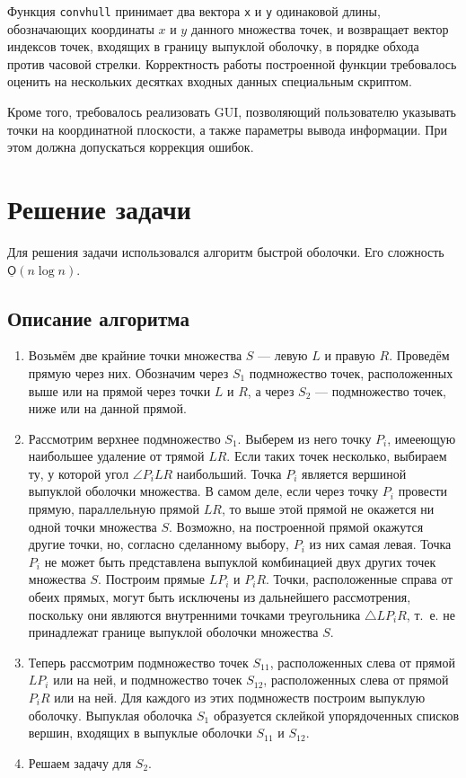 \documentclass[11pt]{article}
\begin{document}
Функция \texttt{convhull} принимает два вектора \texttt{x} и \texttt{y} одинаковой длины, обозначающих координаты $x$ и $y$ данного множества точек, и возвращает вектор индексов точек, входящих в границу выпуклой оболочку, в порядке обхода против часовой стрелки.
Корректность работы построенной функции требовалось оценить на нескольких десятках входных данных специальным скриптом.

Кроме того, требовалось реализовать GUI, позволяющий пользователю указывать точки на координатной плоскости, а также параметры вывода информации. При этом должна допускаться коррекция ошибок.

\section{Решение задачи}
Для решения задачи использовался алгоритм быстрой оболочки. Его сложность $\underline{\mathsf{O}}(n\log{n})$.
\subsection{Описание алгоритма}
\begin{enumerate}
	\item
		Возьмём две крайние точки множества $S$ --- левую $L$ и правую $R$. Проведём прямую через них. Обозначим через $S_1$ подмножество точек, расположенных выше или на прямой через точки $L$ и $R$, а через $S_2$ --- подмножество точек, ниже или на данной прямой.
	\item
		Рассмотрим верхнее подмножество $S_1$. Выберем из него точку $P_i$, имееющую наибольшее удаление от трямой $LR$. Если таких точек несколько, выбираем ту, у которой угол $\angle P_iLR$ наибольший. Точка $P_i$ является вершиной выпуклой оболочки множества. В самом деле, если через точку $P_i$ провести прямую, параллельную прямой $LR$, то выше этой прямой не окажется ни одной точки множества $S$. Возможно, на построенной прямой окажутся другие точки, но, согласно сделанному выбору, $P_i$ из них самая левая. Точка $P_i$ не может быть представлена выпуклой комбинацией двух других точек множества $S$. Построим прямые $LP_i$ и $P_iR$. Точки, расположенные справа от обеих прямых, могут быть исключены из дальнейшего рассмотрения, поскольку они являются внутренними точками треугольника $\triangle LP_iR$, т.~е. не принадлежат границе выпуклой оболочки множества $S$.
	\item
		Теперь рассмотрим подмножество точек $S_{11}$, расположенных слева от прямой $LP_i$ или на ней, и подмножество точек $S_{12}$, расположенных слева от прямой $P_iR$ или на ней. Для каждого из этих подмножеств построим выпуклую оболочку. Выпуклая оболочка $S_1$ образуется склейкой упорядоченных списков вершин, входящих в выпуклые оболочки $S_{11}$ и $S_{12}$.
	\item
		Решаем задачу для $S_2$.
\end{enumerate}
\end{document}
